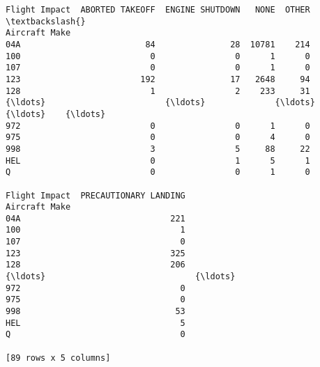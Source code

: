 \documentclass[11pt]{article}
\begin{document}
    \begin{Verbatim}[commandchars=\\\{\}]
Flight Impact  ABORTED TAKEOFF  ENGINE SHUTDOWN   NONE  OTHER  \textbackslash{}
Aircraft Make
04A                         84               28  10781    214
100                          0                0      1      0
107                          0                0      1      0
123                        192               17   2648     94
128                          1                2    233     31
{\ldots}                        {\ldots}              {\ldots}    {\ldots}    {\ldots}
972                          0                0      1      0
975                          0                0      4      0
998                          3                5     88     22
HEL                          0                1      5      1
Q                            0                0      1      0

Flight Impact  PRECAUTIONARY LANDING
Aircraft Make
04A                              221
100                                1
107                                0
123                              325
128                              206
{\ldots}                              {\ldots}
972                                0
975                                0
998                               53
HEL                                5
Q                                  0

[89 rows x 5 columns]
    \end{Verbatim}
\end{document}
